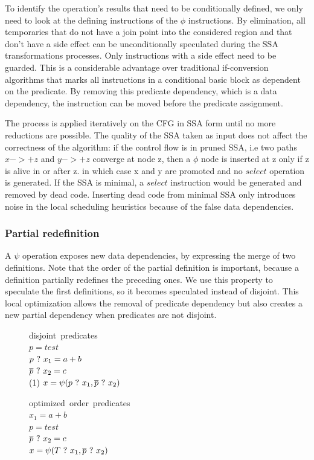To identify the operation's results that need to be conditionally defined, we only need to look at the defining instructions of the $\phi$ instructions. By elimination, all temporaries that do not have a join point into the considered region and that don't have a side effect can be unconditionally speculated during the SSA transformations processes. Only instructions with a side effect need to be guarded. This is a considerable advantage over traditional if-conversion algorithms that marks all instructions in a conditional basic block as dependent on the predicate. By removing this predicate dependency, which is a data dependency, the instruction can be moved before the predicate assignment.

The process is applied iteratively on the CFG in SSA form until no more reductions are possible. The quality of the SSA taken as input does not affect the correctness of the algorithm: if the control flow is in pruned SSA, i.e two paths $x->+z$ and $y->+z$ converge at node z, then a $\phi$ node is inserted at z only if z is alive in or after z. in which case x and y are promoted and no $select$ operation is generated. If the SSA is minimal, a $select$ instruction would be generated and removed by dead code. Inserting dead code from minimal SSA only introduces noise in the local scheduling heuristics because of the false data dependencies.

\subsubsection{Partial redefinition}

A $\psi$ operation exposes new data dependencies, by expressing the merge of two definitions. Note that the order of the partial definition is important, because a definition partially redefines the preceding ones. We use this property to speculate the first definitions, so it becomes speculated instead of disjoint. This local optimization allows the removal of predicate dependency but also creates a new partial dependency when predicates are not disjoint. 

\begin{figure}
\footnotesize
\begin{minipage}[t]{4cm}
\mbox{disjoint predicates} \\
$ p = test $ \\
$ p ~?~ x_1 = a + b $ \\
$ \overline{p} ~?~ x_2 = c $ \\
(1) $ x = \psi(p ~?~ x_1, \overline{p} ~?~ x_2) $ \\
\end{minipage}
\begin{minipage}[t]{4cm}
\mbox{optimized order predicates} \\
$ x_1 = a + b $ \\
$ p = test $ \\
$ \overline{p} ~?~ x_2 = c $ \\
$ x = \psi(T ~?~ x_1, \overline{p} ~?~ x_2) $ \\
\end{minipage}
\end{figure}

